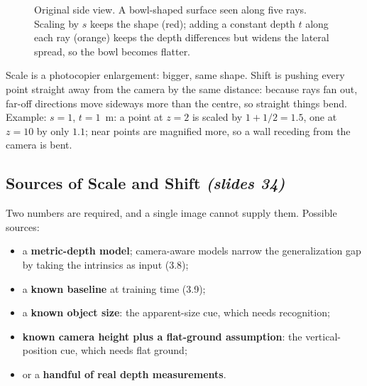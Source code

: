 \documentclass[11pt,a4paper]{article}
\numberwithin{equation}{section}
\newcommand{\slides}[1]{\texorpdfstring{\;\emph{(slides #1)}}{ (slides #1)}}
\theoremstyle{plain}
\theoremstyle{definition}
\begin{document}
\begin{figure}[H]
\centering
{}
\caption{Original side view. A bowl-shaped surface seen along five rays. Scaling by $s$ keeps the shape (red); adding a constant depth $t$ along each ray (orange) keeps the depth differences but widens the lateral spread, so the bowl becomes flatter.}
\end{figure}

\begin{intuition}
Scale is a photocopier enlargement: bigger, same shape. Shift is pushing every point straight away from the camera by the same distance: because rays fan out, far-off directions move sideways more than the centre, so straight things bend. Example: $s=1$, $t=1$~m: a point at $z=2$ is scaled by $1+1/2=1.5$, one at $z=10$ by only $1.1$; near points are magnified more, so a wall receding from the camera is bent.
\end{intuition}

\subsection{Sources of Scale and Shift \slides{34}}
Two numbers are required, and a single image cannot supply them. Possible sources:
\begin{itemize}[nosep]
 \item a \textbf{metric-depth model}; camera-aware models narrow the generalization gap by taking the intrinsics as input (3.8);
 \item a \textbf{known baseline} at training time (3.9);
 \item a \textbf{known object size}: the apparent-size cue, which needs recognition;
 \item \textbf{known camera height plus a flat-ground assumption}: the vertical-position cue, which needs flat ground;
 \item or a \textbf{handful of real depth measurements}.
\end{itemize}
\end{document}
